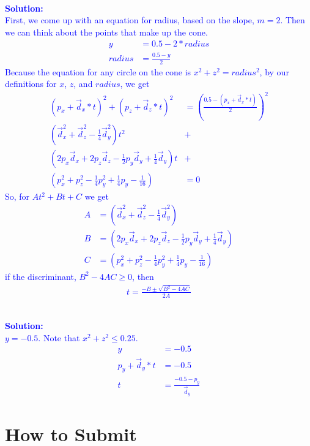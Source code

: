 \documentclass[10pt,twocolumn]{article}
\newcommand{\solution}[1]{\textcolor{Blue}{\\{\bf Solution:} \\ #1}}  %
\begin{document}
\begin{framed}
\solution{
First, we come up with an equation for radius, based on the slope, $m = 2$. Then we can think about the points that make up the cone.
\begin{align*}
y &= 0.5 - 2 * radius\\
radius &= \frac{0.5 - y}{2}
\end{align*}
Because the equation for any circle on the cone is $x^2 + z^2 = radius^2$, by our definitions for $x$, $z$, and $radius$, we get
\begin{align*}
(p_x + \vec{d}_x * t)^2 + (p_z + \vec{d}_z * t)^2 &= \left(\frac{0.5 - (p_x + \vec{d}_x * t)}{2}\right)^2\\
\left(\vec{d}^2_x + \vec{d}^2_z - \frac{1}{4}\vec{d}^2_y\right)t^2 &+\\ 
\left(2p_x\vec{d}_x + 2 p_z\vec{d}_z - \frac{1}{2}p_y\vec{d}_y + \frac{1}{4}\vec{d}_y\right)t &+\\
\left(p^2_x + p^2_z - \frac{1}{4}p^2_y + \frac{1}{4}p_y - \frac{1}{16}\right)&= 0
\end{align*}
So, for $At^2+Bt+C$ we get
\begin{align*}
A &= \left(\vec{d}^2_x + \vec{d}^2_z - \frac{1}{4}\vec{d}^2_y\right)\\
B &= \left(2p_x\vec{d}_x + 2 p_z\vec{d}_z - \frac{1}{2}p_y\vec{d}_y + \frac{1}{4}\vec{d}_y\right)\\
C &= \left(p^2_x + p^2_z - \frac{1}{4}p^2_y + \frac{1}{4}p_y - \frac{1}{16}\right)
\end{align*}
if the discriminant, $B^2 - 4AC \geq 0$, then 
\begin{align*}
t = \frac{-B \pm \sqrt{B^2 - 4AC}}{2A}
\end{align*}
}
\end{framed}
\begin{framed}
\solution{
$y = -0.5$.
Note that $x^2 + z^2 \leq 0.25$.
\begin{align*}
y &= -0.5 \\
p_y + \vec{d}_y * t &= -0.5 \\
t &= \frac{-0.5 - p_y}{\vec{d}_y}
\end{align*}
}
\end{framed}


\section{How to Submit}
\end{document}
